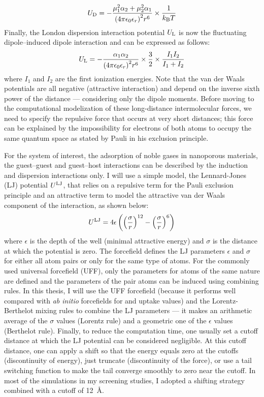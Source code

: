 \documentclass[main.tex]{subfiles}
\begin{document}
\begin{equation}\label{eq:debye}
  U_{\text{D}} = -\dfrac{\mu_1^2\alpha_2 + \mu_2^2\alpha_1}{{(4\pi\epsilon_0\epsilon_r)}^2r^6}\times\dfrac{1}{k_{\text{B}}T}
\end{equation}
Finally, the London dispersion interaction potential $U_{\text{L}}$ is now the fluctuating dipole--induced dipole interaction and can be expressed as follows:
\begin{equation}\label{eq:london}
  U_{\text{L}} = -\frac{\alpha_1\alpha_2}{{(4\pi\epsilon_0\epsilon_r)}^2r^6}\times\frac{3}{2}\times\frac{I_1 I_2}{I_1+I_2}
\end{equation}
where $I_1$ and $I_2$ are the first ionization energies. Note that the van der Waals potentials are all negative (attractive interaction) and depend on the inverse sixth power of the distance --- considering only the dipole moments. Before moving to the computational modelization of these long-distance intermolecular forces, we need to specify the repulsive force that occurs at very short distances; this force can be explained by the impossibility for electrons of both atoms to occupy the same quantum space as stated by Pauli in his exclusion principle.

For the system of interest, the adsorption of noble gases in nanoporous materials, the guest--guest and guest--host interactions can be described by the induction and dispersion interactions only. I will use a simple model, the Lennard-Jones (LJ) potential $U^{\text{LJ}}$,\autocite{LJ_1924} that relies on a repulsive term for the Pauli exclusion principle and an attractive term to model the attractive van der Waals component of the interaction, as shown below:
\begin{equation}\label{eq:LJ}
  U^{\text{LJ}} = 4\epsilon \left({\left(\dfrac{\sigma}{r}\right)}^{12} - {\left(\dfrac{\sigma}{r}\right)}^{6}\right)
\end{equation}
where $\epsilon$ is the depth of the well (minimal attractive energy) and $\sigma$ is the distance at which the potential is zero. The forcefield defines the LJ parameters $\epsilon$ and $\sigma$ for either all atom pairs or only for the same type of atoms. For the commonly used universal forcefield (UFF),\autocite{rappe1992} only the parameters for atoms of the same nature are defined and the parameters of the pair atoms can be induced using combining rules. In this thesis, I will use the UFF forcefield (because it performs well compared with \emph{ab initio} forcefields for  and  uptake values\autocite{McDaniel_2015}) and the Lorentz-Berthelot mixing rules to combine the LJ parameters --- it makes an arithmetic average of the $\sigma$ values (Lorentz rule) and a geometric one of the $\epsilon$ values (Berthelot rule). Finally, to reduce the computation time, one usually set a cutoff distance at which the LJ potential can be considered negligible. At this cutoff distance, one can apply a shift so that the energy equals zero at the cutoffs (discontinuity of energy), just truncate (discontinuity of the force), or use a tail switching function to make the tail converge smoothly to zero near the cutoff. In most of the simulations in my screening studies, I adopted a shifting strategy combined with a cutoff of \SI{12}{\angstrom}.
\end{document}
